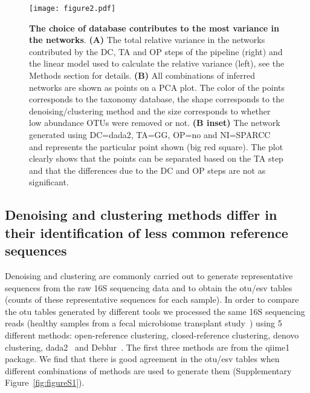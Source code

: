  \begin{figure}[H]
    \centering
    \texttt{[image: figure2.pdf]}
  \end{figure}
  \begin{figure}[!t]
    \centering
      \caption{
      \textbf{The choice of database contributes to the most variance in the networks}.
      \textbf{(A)} The total relative variance in the networks contributed by the DC, TA and OP steps of the pipeline (right) and the linear model used to calculate the relative variance (left), see the Methods section for details.
      \textbf{(B)} All combinations of inferred networks are shown as points on a PCA plot.
      The color of the points corresponds to the taxonomy database, the shape corresponds to the denoising/clustering method and the size corresponds to whether low abundance OTUs were removed or not.
      \textbf{(B inset)} The network generated using DC=dada2, TA=GG, OP=no and NI=SPARCC and represents the particular point shown (big red square).
      The plot clearly shows that the points can be separated based on the TA step and that the differences due to the DC and OP steps are not as significant.
    }
    \label{fig:figure2}
  \end{figure}


  \FloatBarrier

  \subsection*{Denoising and clustering methods differ in their identification of less common reference sequences}

  Denoising and clustering are commonly carried out to generate representative sequences from the raw 16S sequencing data and to obtain the \ac{otu}/\ac{esv} tables (counts of these representative sequences for each sample).
  In order to compare the \ac{otu} tables generated by different tools we processed the same 16S sequencing reads (healthy samples from a fecal microbiome transplant study~\cite{Kang2017}) using 5 different methods:  open-reference clustering, closed-reference clustering, denovo clustering, \ac{dada2}~\cite{Callahan2016} and Deblur~\cite{Amir2017}.
  The first three methods are from the \ac{qiime1}~\cite{Caporaso2010} package.
  We find that there is good agreement in the \ac{otu}/\ac{esv} tables when different combinations of methods are used to generate them (Supplementary Figure~\ref{fig:figureS1}).

